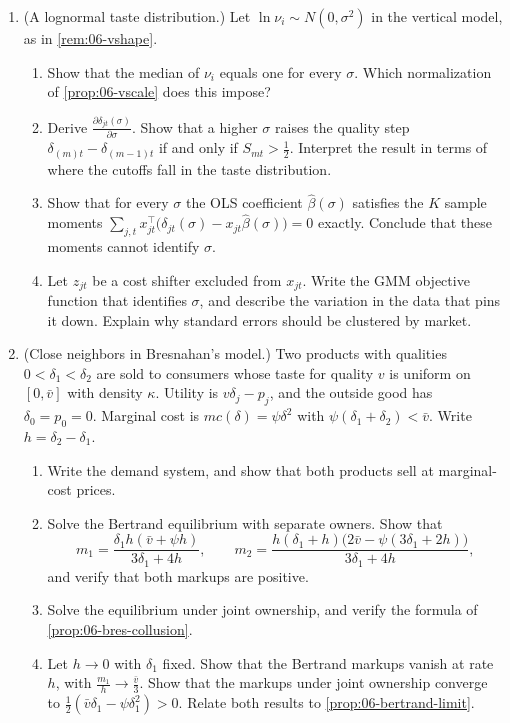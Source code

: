 \begin{enumerate}[label=\arabic*., leftmargin=*, itemsep=6pt]
\item (A lognormal taste distribution.) Let $\ln\nu_i \sim N(0, \sigma^2)$ in the vertical model, as in
\cref{rem:06-vshape}.
\begin{enumerate}[label=(\alph*)]
  \item Show that the median of $\nu_i$ equals one for every $\sigma$. Which normalization of \cref{prop:06-vscale}
  does this impose?
  \item Derive $\frac{\partial\delta_{jt}(\sigma)}{\partial\sigma}$. Show that a higher $\sigma$ raises the quality step
  $\delta_{(m)t} - \delta_{(m-1)t}$ if and only if $S_{mt} > \frac{1}{2}$. Interpret the result in terms of where the
  cutoffs fall in the taste distribution.
  \item Show that for every $\sigma$ the OLS coefficient $\hat\beta(\sigma)$ satisfies the $K$ sample moments
  $\sum_{j,t}x_{jt}^\top\big(\delta_{jt}(\sigma) - x_{jt}\hat\beta(\sigma)\big) = 0$ exactly. Conclude that these
  moments cannot identify $\sigma$.
  \item Let $z_{jt}$ be a cost shifter excluded from $x_{jt}$. Write the GMM objective function that identifies
  $\sigma$, and describe the variation in the data that pins it down. Explain why standard errors should be
  clustered by market.
\end{enumerate}

\item (Close neighbors in Bresnahan's model.) Two products with qualities $0 < \delta_1 < \delta_2$ are sold to
consumers whose taste for quality $v$ is uniform on $[0, \bar v]$ with density $\kappa$. Utility is
$v\delta_j - p_j$, and the outside good has $\delta_0 = p_0 = 0$. Marginal cost is $mc(\delta) = \psi\delta^2$ with
$\psi(\delta_1 + \delta_2) < \bar v$. Write $h = \delta_2 - \delta_1$.
\begin{enumerate}[label=(\alph*)]
  \item Write the demand system, and show that both products sell at marginal-cost prices.
  \item Solve the Bertrand equilibrium with separate owners. Show that
  \begin{equation*}
    m_1 = \frac{\delta_1 h(\bar v + \psi h)}{3\delta_1 + 4h}, \qquad
    m_2 = \frac{h(\delta_1 + h)\big(2\bar v - \psi(3\delta_1 + 2h)\big)}{3\delta_1 + 4h},
  \end{equation*}
  and verify that both markups are positive.
  \item Solve the equilibrium under joint ownership, and verify the formula of \cref{prop:06-bres-collusion}.
  \item Let $h \to 0$ with $\delta_1$ fixed. Show that the Bertrand markups vanish at rate $h$, with
  $\frac{m_1}{h} \to \frac{\bar v}{3}$. Show that the markups under joint ownership converge to
  $\frac{1}{2}(\bar v\delta_1 - \psi\delta_1^2) > 0$. Relate both results to \cref{prop:06-bertrand-limit}.
\end{enumerate}


\end{enumerate}
